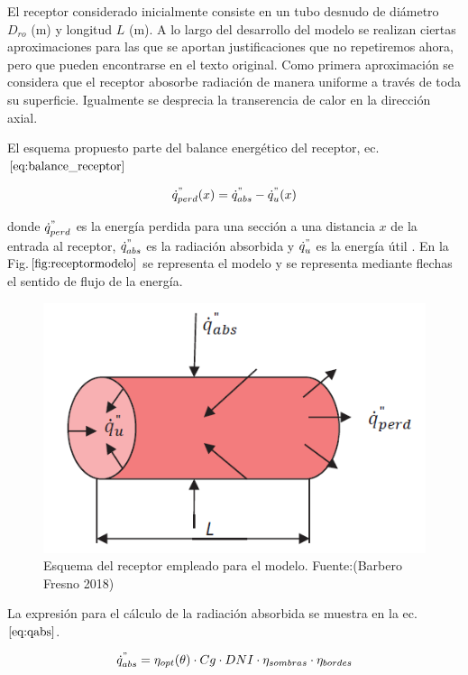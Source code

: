 El receptor considerado inicialmente consiste en un tubo desnudo de
diámetro \(D_{ro}\) (m) y longitud \(L\) (m). A lo largo del desarrollo
del modelo se realizan ciertas aproximaciones para las que se aportan
justificaciones que no repetiremos ahora, pero que pueden encontrarse en
el texto original. Como primera aproximación se considera que el
receptor abosorbe radiación de manera uniforme a través de toda su
superficie. Igualmente se desprecia la transerencia de calor en la
dirección axial.

El esquema propuesto parte del balance energético del receptor,
ec.\(\eqref{eq:balance_receptor}\)

\begin{equation}
    \dot{q}^{"}_{perd}(x) = \dot{q}^{"}_{abs}-\dot{q}^{"}_{u}(x) \label{eq:balance_receptor}
\end{equation}

donde \(\dot{q}^{"}_{perd}\) es la energía perdida para una sección a
una distancia \(x\) de la entrada al receptor, \(\dot{q}^{"}_{abs}\) es
la radiación absorbida y \(\dot{q}^{"}_{u}\) es la energía útil . En la
Fig.\(\ref{fig:receptormodelo}\) se representa el modelo y se representa
mediante flechas el sentido de flujo de la energía.

\begin{figure}
\includegraphics[scale=0.8]{images/receptor_para_modelo.png}
\caption{Esquema del receptor empleado para el modelo. Fuente:(Barbero Fresno 2018)} 
\label{fig:receptormodelo}
\end{figure}

La expresión para el cálculo de la radiación absorbida se muestra en la
ec.\(\eqref{eq:qabs}\).

\begin{equation}
    \dot{q}^{"}_{abs}= \eta_{opt}(\theta) \cdot Cg \cdot DNI \cdot \eta_{sombras} \cdot \eta_{bordes} \label{eq:qabs}
\end{equation}

